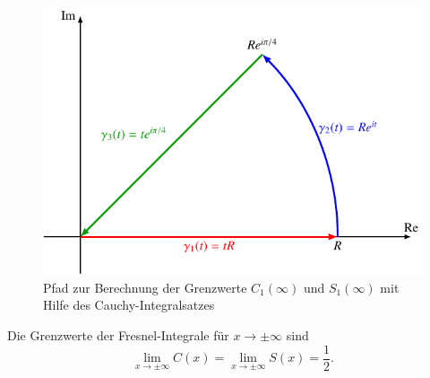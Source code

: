 \begin{figure}
\centering
\includegraphics{papers/fresnel/pfad.pdf}
\caption{Pfad zur Berechnung der Grenzwerte $C_1(\infty)$ und
$S_1(\infty)$ mit Hilfe des Cauchy-Integralsatzes
\label{fresnel:figure:pfad}}
\end{figure}


\begin{satz}
Die Grenzwerte der Fresnel-Integrale für $x\to\pm\infty$ sind
\[
\lim_{x\to\pm\infty} C(x)
=
\lim_{x\to\pm\infty} S(x)
=
\frac12.
\]
\end{satz}

